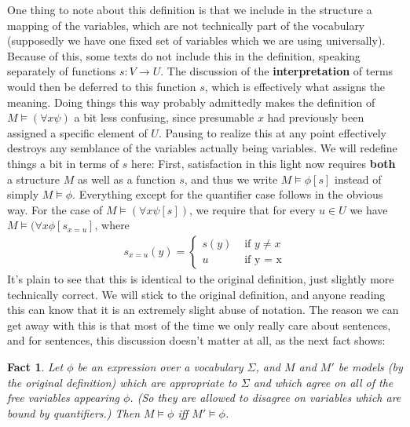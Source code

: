 \documentclass{article}
\theoremstyle{definition}
\theoremstyle{plain}
\theoremstyle{theorem}
\newtheorem{fact}{Fact}[section]
\begin{document}
One thing to note about this definition is that we include in the structure a mapping of the variables, which are not technically part of the vocabulary (supposedly we have one fixed set of variables which we are using universally). Because of this, some texts do not include this in the definition, speaking separately of functions $s: V \to U$. The discussion of the \textbf{interpretation} of terms would then be deferred to this function $s$, which is effectively what assigns the meaning. Doing things this way probably admittedly makes the definition of $M \models (\forall x \psi)$ a bit less confusing, since presumable $x$ had previously been assigned a specific element of $U$. Pausing to realize this at any point effectively destroys any semblance of the variables actually being variables. We will redefine things a bit in terms of $s$ here: First, satisfaction in this light now requires \textbf{both} a structure $M$ as well as a function $s$, and thus we write $M \models \phi[s]$ instead of simply $M \models \phi$. Everything except for the quantifier case follows in the obvious way. For the case of $M \models (\forall x \psi[s])$, we require that for every $u \in U$ we have $M \models (\forall x \phi[s_{x=u}]$, where
\begin{align}
    s_{x=u}(y) = \begin{cases}
                 s(y) & \textrm{ if $y \neq x$}\\
                 u & \textrm{ if y = x}
              \end{cases}
\end{align}
It's plain to see that this is identical to the original definition, just slightly more technically correct. We will stick to the original definition, and anyone reading this can know that it is an extremely slight abuse of notation. The reason we can get away with this is that most of the time we only really care about sentences, and for sentences, this discussion doesn't matter at all, as the next fact shows:
\begin{fact}
    Let $\phi$ be an expression over a vocabulary $\Sigma$, and $M$ and $M'$ be models (by the original definition) which are appropriate to $\Sigma$ and which agree on all of the free variables appearing $\phi$. (So they are allowed to disagree on variables which are bound by quantifiers.) Then $M \models \phi$ iff $M' \models \phi$.  
\end{fact}
\end{document}
